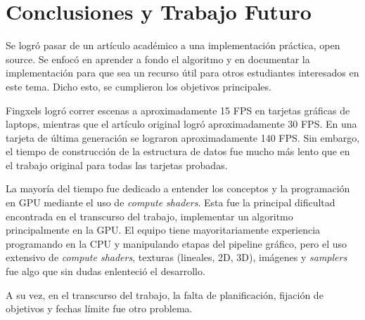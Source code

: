 \graphicspath{{chapters/6_conclusión/figures/}}



\chapter{Conclusiones y Trabajo Futuro}\label{chap:conclusions}

Se logró pasar de un artículo académico a una implementación práctica, open source.
Se enfocó en aprender a fondo el algoritmo y en documentar la implementación para que sea un recurso útil para otros estudiantes interesados en este tema.
Dicho esto, se cumplieron los objetivos principales.

Fingxels logró correr escenas a aproximadamente 15 FPS en tarjetas gráficas de laptops, mientras que el artículo original logró aproximadamente 30 FPS.
En una tarjeta de última generación se lograron aproximadamente 140 FPS.
Sin embargo, el tiempo de construcción de la estructura de datos fue mucho más lento que en el trabajo original para todas las tarjetas probadas.

La mayoría del tiempo fue dedicado a entender los conceptos y la programación en GPU mediante el uso de \textit{compute shaders}.
Esta fue la principal dificultad encontrada en el transcurso del trabajo, implementar un algoritmo principalmente en la GPU.
El equipo tiene mayoritariamente experiencia programando en la CPU y manipulando etapas del pipeline gráfico, pero el uso extensivo de \textit{compute shaders}, texturas (lineales, 2D, 3D), imágenes y \textit{samplers} fue algo que sin dudas enlenteció el desarrollo.

A su vez, en el transcurso del trabajo, la falta de planificación, fijación de objetivos y fechas límite fue otro problema.

